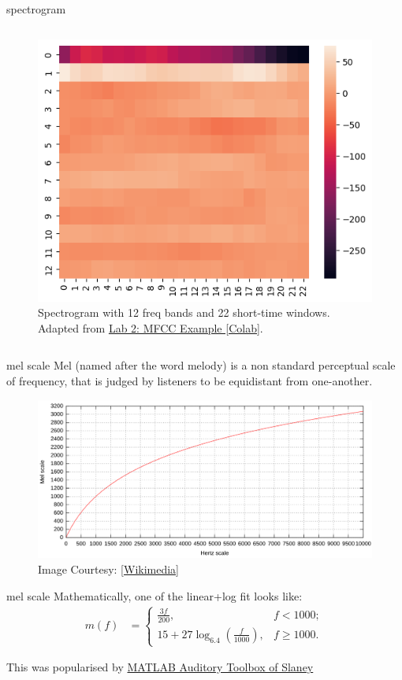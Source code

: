 \documentclass[aspectratio=169,xcolor={dvipsnames,svgnames}]{beamer}
\begin{document}
\begin{frame}[label={sec:orge725335}]{spectrogram}
\begin{columns}
\begin{column}{.55\columnwidth}
\begin{figure}[htbp]
\centering
\includegraphics[width=0.75\linewidth]{org-download-images/introduction/2024-09-16_21-04-10_screenshot.png}
\caption{Spectrogram with 12 freq bands and 22 short-time windows.  Adapted from \href{https://colab.research.google.com/drive/1pkopM-0bSoxH1WDwq94bFSBxXpkHrjI3}{Lab 2: MFCC Example [Colab]​}.}
\end{figure}
\end{column}
\end{columns}
\end{frame}
\begin{frame}[label={sec:orgbf4059f}]{mel scale}
Mel (named after the word melody) is a non standard
perceptual scale of frequency, that is judged by
listeners to be equidistant from one-another.

\begin{figure}[htbp]
\centering
\includegraphics[width=0.75\linewidth]{org-download-images/introduction/2024-09-16_21-16-21_screenshot.png}
\caption{Image Courtesy: \href{https://en.wikipedia.org/wiki/File:Mel-Hz\_plot.svg}{[Wikimedia]​}}
\end{figure}
\end{frame}
\begin{frame}[label={sec:org2502c08}]{mel scale}
Mathematically, one of the linear+log fit looks like:
\begin{align*}
  m(f) &= \begin{cases}
    \frac{3f}{200}, &f<1000; \\
    15+27\log_{6.4}\left( \frac{f}{1000} \right),
                    &f\geqslant1000.
  \end{cases}
\end{align*}

This was popularised by \href{https://engineering.purdue.edu/\~malcolm/interval/1998-010/}{MATLAB Auditory Toolbox of
Slaney}
\end{frame}
\end{document}

